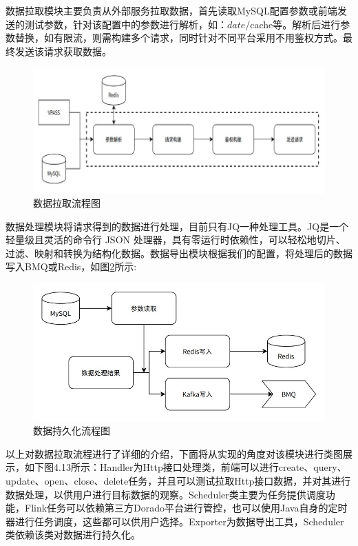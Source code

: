 数据拉取模块主要负责从外部服务拉取数据，首先读取MySQL配置参数或前端发送的测试参数，针对该配置中的参数进行解析，如：${date}/${cache}等。解析后进行参数替换，如有限流，则需构建多个请求，同时针对不同平台采用不用鉴权方式。最终发送该请求获取数据。
    \begin{figure}[htb]
  \centering
  \includegraphics[width=5in]{figure/chapter4/数据拉取流程图.jpg}
  \caption{数据拉取流程图}\label{shujulaquliucheng}
\end{figure}

数据处理模块将请求得到的数据进行处理，目前只有JQ一种处理工具。JQ是一个轻量级且灵活的命令行 JSON 处理器，具有零运行时依赖性，可以轻松地切片、过滤、映射和转换为结构化数据。数据导出模块根据我们的配置，将处理后的数据写入BMQ或Redis，如图\ref{shujulaquliucheng}所示:

     \begin{figure}[htb]
  \centering
  \includegraphics[width=5in]{figure/chapter4/数据持久化流程图.jpg}
  \caption{数据持久化流程图}\label{shujulaquliucheng}
\end{figure}

以上对数据拉取流程进行了详细的介绍，下面将从实现的角度对该模块进行类图展示，如下图4.13所示：Handler为Http接口处理类，前端可以进行create、query、update、open、close、delete任务，并且可以测试拉取Http接口数据，并对其进行数据处理，以供用户进行目标数据的观察。Scheduler类主要为任务提供调度功能，Flink任务可以依赖第三方Dorado平台进行管控，也可以使用Java自身的定时器进行任务调度，这些都可以供用户选择。Exporter为数据导出工具，Scheduler类依赖该类对数据进行持久化。

